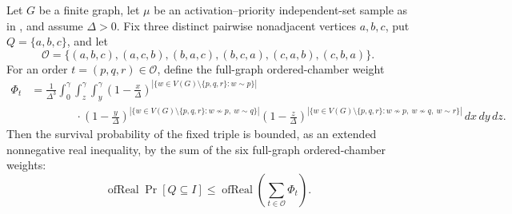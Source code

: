 \begin{helper}
Let $G$ be a finite graph, let $\mu$ be an activation--priority independent-set
sample as in , and assume $\Delta>0$.
Fix three distinct pairwise nonadjacent vertices $a,b,c$, put
$Q=\{a,b,c\}$, and let
\[
\mathcal O=\{(a,b,c),(a,c,b),(b,a,c),(b,c,a),(c,a,b),(c,b,a)\}.
\]
For an order $t=(p,q,r)\in\mathcal O$, define the full-graph ordered-chamber
weight
\[
\begin{aligned}
\Phi_t
&=\frac{1}{\Delta^3}
\int_0^\gamma\int_z^\gamma\int_y^\gamma
\left(1-\frac{x}{\Delta}\right)^{|\{w\in V(G)\setminus\{p,q,r\}:w\sim p\}|} \\
&\qquad\qquad\cdot
\left(1-\frac{y}{\Delta}\right)^{
|\{w\in V(G)\setminus\{p,q,r\}:w\not\sim p,\ w\sim q\}|}
\left(1-\frac{z}{\Delta}\right)^{
|\{w\in V(G)\setminus\{p,q,r\}:w\not\sim p,\ w\not\sim q,\ w\sim r\}|}
\,dx\,dy\,dz .
\end{aligned}
\]
Then the survival probability of the fixed triple is bounded, as an extended
nonnegative real inequality, by the sum of the six full-graph ordered-chamber
weights:
\[
\operatorname{ofReal}\Pr[Q\subseteq I]\le
\operatorname{ofReal}\left(\sum_{t\in\mathcal O}\Phi_t\right).
\]
\end{helper}

